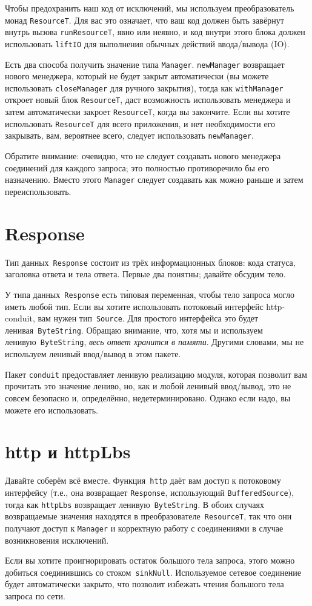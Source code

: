 Чтобы предохранить наш код от исключений, мы
используем преобразователь монад \lstinline!ResourceT!. Для вас это
означает, что ваш код должен быть завёрнут внутрь вызова
\lstinline!runResourceT!, явно или неявно, и код внутри этого блока
должен использовать \lstinline!liftIO! для выполнения обычных действий
ввода/вывода (IO).

Есть два способа получить значение типа \lstinline!Manager!.
\lstinline!newManager! возвращает нового менеджера, который не
будет закрыт автоматически (вы можете использовать
\lstinline!closeManager! для ручного закрытия), тогда как
\lstinline!withManager! откроет новый блок \lstinline!ResourceT!, даст
возможность использовать менеджера и затем автоматически закроет
\lstinline!ResourceT!, когда вы закончите. Если вы хотите использовать
\lstinline!ResourceT! для всего приложения, и нет необходимости
его закрывать, вам, вероятнее всего, следует использовать \lstinline!newManager!.

Обратите внимание: очевидно, что не следует создавать нового
менеджера соединений для каждого запроса; это полностью противоречило бы
его назначению. Вместо этого \lstinline!Manager! следует создавать как можно
раньше и затем переиспользовать.

\section{Response}
Тип данных~\lstinline!Response! состоит из трёх информационных блоков:
кода статуса, заголовка ответа и тела ответа. Первые два понятны;
давайте обсудим тело.

У типа данных~\lstinline!Response! есть т\'иповая переменная, чтобы
тело запроса могло иметь любой тип. Если вы хотите
использовать потоковый интерфейс http-conduit, вам нужен
тип~\lstinline!Source!. Для простого интерфейса это будет
ленивая~\lstinline!ByteString!. Обращаю внимание, что, хотя мы и
используем ленивую~\lstinline!ByteString!, \emph{весь ответ хранится в
памяти}. Другими словами, мы не используем ленивый ввод/вывод в этом
пакете.

\begin{remark}
Пакет \texttt{conduit} предоставляет ленивую реализацию модуля, которая
позволит вам прочитать это значение лениво, но, как и любой ленивый
ввод/вывод, это не совсем безопасно и, определённо, недетерминировано.
Однако если надо, вы можете его использовать.
\end{remark}

\section{http и httpLbs}
Давайте соберём всё вместе. Функция~\lstinline!http! даёт вам доступ к
потоковому интерфейсу (т.е., она возвращает \lstinline!Response!,
использующий \lstinline!BufferedSource!), тогда как
\lstinline!httpLbs! возвращает ленивую~\lstinline!ByteString!.
В обоих случаях возвращаемые значения находятся в
преобразователе~\lstinline!ResourceT!, так что они
получают доступ к \lstinline!Manager! и корректную работу с соединениями в
случае возникновения исключений.

\begin{remark}
Если вы хотите проигнорировать остаток большого тела запроса, этого можно добиться
соединившись со стоком~\lstinline!sinkNull!. Используемое сетевое
соединение будет автоматически закрыто, что позволит избежать
чтения большого тела запроса по сети.
\end{remark}
